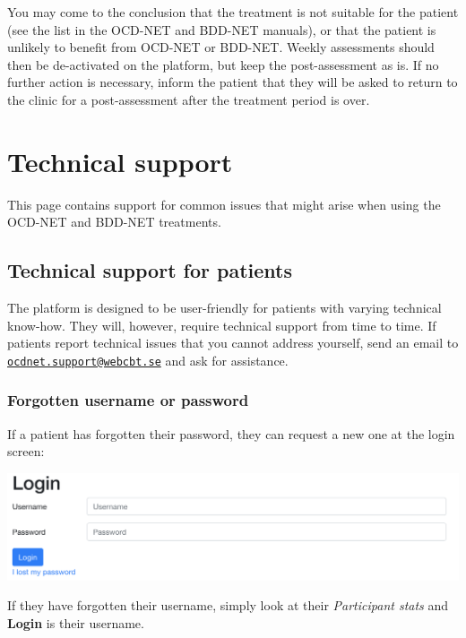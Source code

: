 \documentclass[]{book}
\begin{document}
You may come to the conclusion that the treatment is not suitable for the patient (see the list in the OCD-NET and BDD-NET manuals), or that the patient is unlikely to benefit from OCD-NET or BDD-NET. Weekly assessments should then be de-activated on the platform, but keep the post-assessment as is. If no further action is necessary, inform the patient that they will be asked to return to the clinic for a post-assessment after the treatment period is over.

\hypertarget{technical-support}{%
\chapter{Technical support}\label{technical-support}}

This page contains support for common issues that might arise when using the OCD-NET and BDD-NET treatments.

\hypertarget{technical-support-for-patients}{%
\section{Technical support for patients}\label{technical-support-for-patients}}

The platform is designed to be user-friendly for patients with varying technical know-how. They will, however, require technical support from time to time. If patients report technical issues that you cannot address yourself, send an email to \href{mailto:ocdnet.support@webcbt.se}{\nolinkurl{ocdnet.support@webcbt.se}} and ask for assistance.

\hypertarget{forgotten-username-or-password}{%
\subsection{Forgotten username or password}\label{forgotten-username-or-password}}

If a patient has forgotten their password, they can request a new one at the login screen:

\includegraphics{images/patient-login.png}

If they have forgotten their username, simply look at their \emph{Participant stats} and \textbf{Login} is their username.
\end{document}
